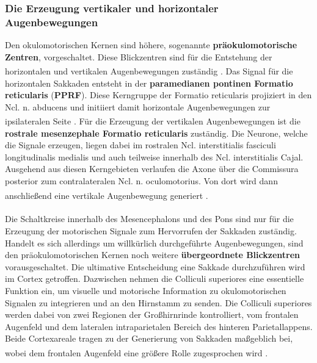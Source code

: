 \subsubsection*{Die Erzeugung vertikaler und horizontaler Augenbewegungen}
Den okulomotorischen Kernen sind höhere, sogenannte \textbf{präokulomotorische Zentren}, vorgeschaltet. Diese Blickzentren sind für die Entstehung der horizontalen und vertikalen Augenbewegungen zuständig \textsuperscript{\cite[Kap.~6]{trepel2011neuroanatomie}}.   
Das Signal für die horizontalen Sakkaden entsteht in der \textbf{paramedianen pontinen Formatio reticularis} (\textbf{PPRF}). Diese Kerngruppe der Formatio reticularis projiziert in den Ncl. n. abducens und initiiert damit horizontale Augenbewegungen zur ipsilateralen Seite \textsuperscript{\cite[Kap.~39]{kandel2013principles}}. Für die Erzeugung der vertikalen Augenbewegungen ist die \textbf{rostrale mesenzephale Formatio reticularis} zuständig. Die Neurone, welche die Signale erzeugen, liegen dabei im rostralen Ncl. interstitialis fasciculi longitudinalis medialis und auch teilweise innerhalb des Ncl. interstitialis Cajal. Ausgehend aus diesen Kerngebieten verlaufen die Axone über die Commissura posterior zum contralateralen Ncl. n. oculomotorius. Von dort wird dann anschließend eine vertikale Augenbewegung generiert
\textsuperscript{\cite[Kap.~6]{trepel2011neuroanatomie}}. \\      
\\ \noindent Die Schaltkreise innerhalb des Mesencephalons und des Pons sind nur für die Erzeugung der motorischen Signale zum Hervorrufen der Sakkaden zuständig. Handelt es sich allerdings um willkürlich durchgeführte Augenbewegungen, sind den präokulomotorischen Kernen noch weitere \textbf{übergeordnete Blickzentren} vorausgeschaltet. Die ultimative Entscheidung eine Sakkade durchzuführen wird im Cortex getroffen. Dazwischen nehmen die Colliculi superiores  eine essentielle Funktion ein, um visuelle und motorische Information zu okulomotorischen Signalen zu integrieren und an den Hirnstamm zu senden. Die Colliculi superiores werden dabei von zwei Regionen der Großhirnrinde kontrolliert, vom frontalen Augenfeld  und dem lateralen intraparietalen Bereich des hinteren Parietallappens. Beide Cortexareale tragen zu der Generierung von Sakkaden maßgeblich bei, wobei dem frontalen Augenfeld eine größere Rolle zugesprochen wird \textsuperscript{\cite[Kap.~39]{kandel2013principles}}.             